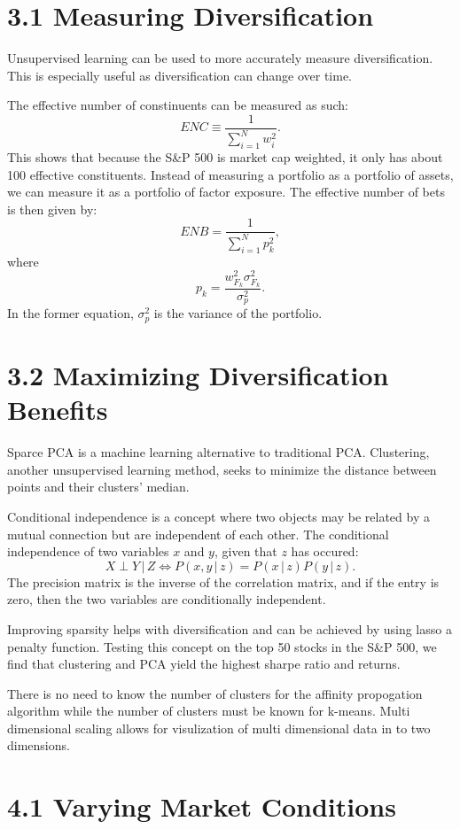 \documentclass{article}
\begin{document}
\section*{3.1 Measuring Diversification}

Unsupervised learning can be used to more accurately measure
diversification. This is especially useful as diversification
can change over time.

The effective number of constinuents can be measured as such:
\[
ENC \equiv \frac{1}{\sum_{i=1}^{N}w_i^2}.
\]
This shows that because the S\&P 500 is market cap weighted,
it only has about 100 effective constituents. Instead of 
measuring a portfolio as a portfolio of assets, we can measure
it as a portfolio of factor exposure. The effective number of
bets is then given by:
\[
ENB = \frac{1}{\sum_{i=1}^{N}p_k^2},
\]
where \[p_k = \frac{w_{F_k}^2\sigma_{F_k}^2}{\sigma_p^2}.\]
In the former equation, $\sigma_p^2$ is the variance of the
portfolio.

\section*{3.2 Maximizing Diversification Benefits}

Sparce PCA is a machine learning alternative 
to traditional PCA. Clustering, another unsupervised
learning method, seeks to minimize the distance between points
and their clusters' median. 

Conditional independence is a concept where two objects
may be related by a mutual connection but are independent of
each other. The conditional independence of two variables $x$
and $y$, given that $z$ has occured:
\[
X \perp Y \,|\, Z \Leftrightarrow P(x,y\,|\,z) = P(x\,|\,z)P(y\,|\,z).
\]
The precision matrix is the inverse of the correlation
matrix, and if the entry is zero, then the two variables 
are conditionally independent.

Improving sparsity helps with diversification and can be
achieved by using lasso a penalty function. Testing this
concept on the top 50 stocks in the S\&P 500,
we find that clustering and PCA yield the highest
sharpe ratio and returns.   

There is no need to know the number of clusters for the affinity
propogation algorithm while the number of clusters must be known
for k-means. Multi dimensional scaling allows for visulization 
of multi dimensional data in to two dimensions. 

\section*{4.1 Varying Market Conditions}
\end{document}
